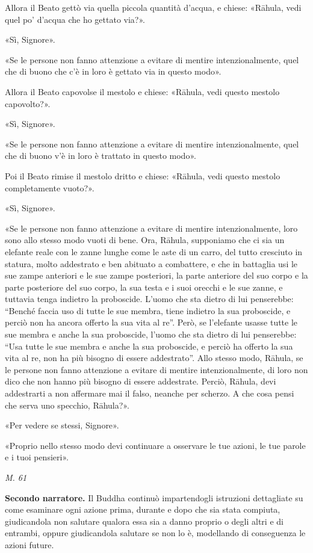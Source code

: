 Allora il Beato gettò via quella piccola quantità d’acqua, e chiese:
«Rāhula, vedi quel po’ d’acqua che ho gettato via?».


«Sì, Signore».


«Se le persone non fanno attenzione a evitare di mentire
intenzionalmente, quel che di buono che c’è in loro è gettato via in
questo modo».


Allora il Beato capovolse il mestolo e chiese: «Rāhula, vedi questo
mestolo capovolto?».


«Sì, Signore».


«Se le persone non fanno attenzione a evitare di mentire
intenzionalmente, quel che di buono v’è in loro è trattato in questo
modo».


Poi il Beato rimise il mestolo dritto e chiese: «Rāhula, vedi questo
mestolo completamente vuoto?».


«Sì, Signore».


«Se le persone non fanno attenzione a evitare di mentire
intenzionalmente, loro sono allo stesso modo vuoti di bene. Ora, Rāhula,
supponiamo che ci sia un elefante reale con le zanne lunghe come le aste
di un carro, del tutto cresciuto in statura, molto addestrato e ben
abituato a combattere, e che in battaglia usi le sue zampe anteriori e
le sue zampe posteriori, la parte anteriore del suo corpo e la parte
posteriore del suo corpo, la sua testa e i suoi orecchi e le sue zanne,
e tuttavia tenga indietro la proboscide. L’uomo che sta dietro di lui
penserebbe: “Benché faccia uso di tutte le sue membra, tiene indietro la
sua proboscide, e perciò non ha ancora offerto la sua vita al re”. Però,
se l’elefante usasse tutte le sue membra e anche la sua proboscide,
l’uomo che sta dietro di lui penserebbe: “Usa tutte le sue membra e
anche la sua proboscide, e perciò ha offerto la sua vita al re, non ha
più bisogno di essere addestrato”. Allo stesso modo, Rāhula, se le
persone non fanno attenzione a evitare di mentire intenzionalmente, di
loro non dico che non hanno più bisogno di essere addestrate. Perciò,
Rāhula, devi addestrarti a non affermare mai il falso, neanche per
scherzo. A che cosa pensi che serva uno specchio, Rāhula?».


«Per vedere se stessi, Signore».


«Proprio nello stesso modo devi continuare a osservare le tue azioni, le
tue parole e i tuoi pensieri».


\emph{M. 61}


\textbf{Secondo narratore.} Il Buddha continuò impartendogli istruzioni
dettagliate su come esaminare ogni azione prima, durante e dopo che sia
stata compiuta, giudicandola non salutare qualora essa sia a danno
proprio o degli altri e di entrambi, oppure giudicandola salutare se non
lo è, modellando di conseguenza le azioni future.


